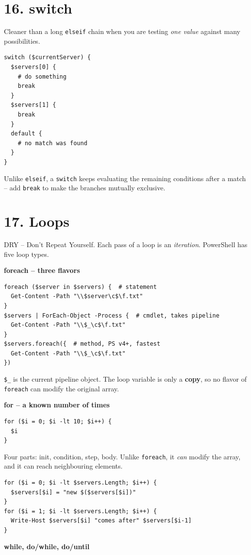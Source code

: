 \section{16. switch}
Cleaner than a long \texttt{elseif} chain when you are testing \emph{one value} against many possibilities.
\begin{verbatim}
switch ($currentServer) {
  $servers[0] {
    # do something
    break
  }
  $servers[1] {
    break
  }
  default {
    # no match was found
  }
}
\end{verbatim}
Unlike \texttt{elseif}, a \texttt{switch} keeps evaluating the remaining conditions after a match -- add \texttt{break} to make the branches mutually exclusive.

\section{17. Loops}
DRY -- Don't Repeat Yourself. Each pass of a loop is an \emph{iteration}. PowerShell has five loop types.

\textbf{foreach -- three flavors}

\begin{verbatim}
foreach ($server in $servers) {  # statement
  Get-Content -Path "\\$server\c$\f.txt"
}
$servers | ForEach-Object -Process {  # cmdlet, takes pipeline
  Get-Content -Path "\\$_\c$\f.txt"
}
$servers.foreach({  # method, PS v4+, fastest
  Get-Content -Path "\\$_\c$\f.txt"
})
\end{verbatim}
\texttt{\$\_} is the current pipeline object. The loop variable is only a \textbf{copy}, so no flavor of \texttt{foreach} can modify the original array.

\textbf{for -- a known number of times}

\begin{verbatim}
for ($i = 0; $i -lt 10; $i++) {
  $i
}
\end{verbatim}
Four parts: init, condition, step, body. Unlike \texttt{foreach}, it \emph{can} modify the array, and it can reach neighbouring elements.
\begin{verbatim}
for ($i = 0; $i -lt $servers.Length; $i++) {
  $servers[$i] = "new $($servers[$i])"
}
for ($i = 1; $i -lt $servers.Length; $i++) {
  Write-Host $servers[$i] "comes after" $servers[$i-1]
}
\end{verbatim}

\textbf{while, do/while, do/until}

